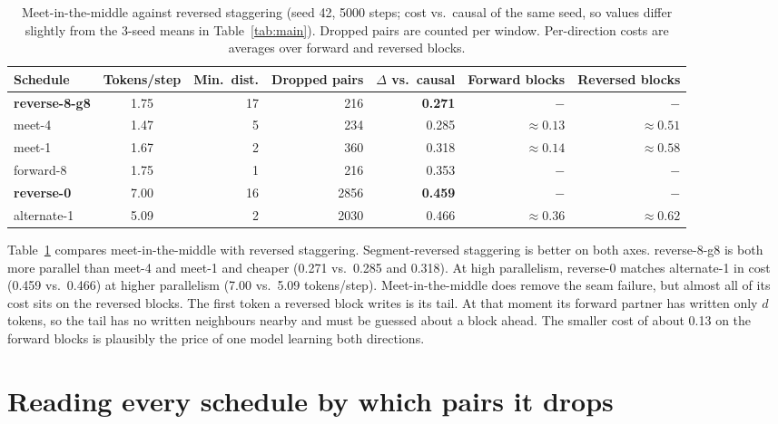 \documentclass[11pt]{article}
\theoremstyle{definition}
\theoremstyle{remark}
\newcommand{\sch}[1]{\textsf{#1}}
\begin{document}
\begin{table}[t]
  \centering
  \caption{Meet-in-the-middle against reversed staggering (seed 42, 5000 steps; cost vs.\ causal of the same seed, so values differ slightly from the 3-seed means in Table~\ref{tab:main}). Dropped pairs are counted per window. Per-direction costs are averages over forward and reversed blocks.}
  \label{tab:meet}
  \small
  \begin{tabular}{lcrrrrr}
    \toprule
    Schedule & Tokens/step & Min.\ dist. & Dropped pairs & $\Delta$ vs.\ causal & Forward blocks & Reversed blocks \\
    \midrule
    \textbf{\sch{reverse-8-g8}} & 1.75 & 17 & 216  & \textbf{0.271} & $-$ & $-$ \\
    \sch{meet-4}                & 1.47 & 5  & 234  & 0.285 & $\approx0.13$ & $\approx0.51$ \\
    \sch{meet-1}                & 1.67 & 2  & 360  & 0.318 & $\approx0.14$ & $\approx0.58$ \\
    \sch{forward-8}             & 1.75 & 1  & 216  & 0.353 & $-$ & $-$ \\
    \midrule
    \textbf{\sch{reverse-0}}    & 7.00 & 16 & 2856 & \textbf{0.459} & $-$ & $-$ \\
    \sch{alternate-1}           & 5.09 & 2  & 2030 & 0.466 & $\approx0.36$ & $\approx0.62$ \\
    \bottomrule
  \end{tabular}
\end{table}

Table~\ref{tab:meet} compares meet-in-the-middle with reversed staggering.
Segment-reversed staggering is better on both axes.
\sch{reverse-8-g8} is both more parallel than \sch{meet-4} and \sch{meet-1} and cheaper (0.271 vs.\ 0.285 and 0.318).
At high parallelism, \sch{reverse-0} matches \sch{alternate-1} in cost (0.459 vs.\ 0.466) at higher parallelism (7.00 vs.\ 5.09 tokens/step).
Meet-in-the-middle does remove the seam failure, but almost all of its cost sits on the reversed blocks.
The first token a reversed block writes is its tail.
At that moment its forward partner has written only $d$ tokens, so the tail has no written neighbours nearby and must be guessed about a block ahead.
The smaller cost of about 0.13 on the forward blocks is plausibly the price of one model learning both directions.

\section{Reading every schedule by which pairs it drops}
\label{sec:lens}
\end{document}
